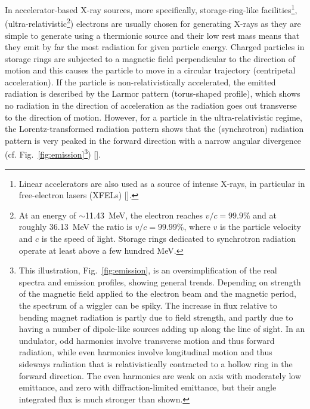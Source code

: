 \begin{refsection}
In accelerator-based X-ray sources, more specifically, storage-ring-like facilities\footnote{Linear accelerators are also used as a source of intense X-rays, in particular in free-electron lasers (XFELs) [\cite{Huang2007}].}, (ultra-relativistic\footnote{At an energy of $\sim$11.43~MeV, the electron reaches $v/c = 99.9\%$ and at roughly 36.13~MeV the ratio is $v/c = 99.99\%$, where $v$ is the particle velocity and $c$ is the speed of light. Storage rings dedicated to synchrotron radiation operate at least above a few hundred MeV.}) electrons are usually chosen for generating X-rays as they are simple to generate using a thermionic source and their low rest mass means that they emit by far the most radiation for given particle energy. Charged particles in storage rings are subjected to a magnetic field perpendicular to the direction of motion and this causes the particle to move in a circular trajectory (centripetal acceleration). If the particle is non-relativistically accelerated, the emitted radiation is described by the Larmor pattern (torus-shaped profile), which shows no radiation in the direction of acceleration as the radiation goes out transverse to the direction of motion. However, for a particle in the ultra-relativistic regime, the Lorentz-transformed radiation pattern shows that the (synchrotron) radiation pattern is very peaked in the forward direction with a narrow angular divergence (cf. Fig.~\ref{fig:emission}\footnote{This illustration, Fig.~\ref{fig:emission}, is an oversimplification of the real spectra and emission profiles, showing general trends. Depending on strength of the magnetic field applied to the electron beam and the magnetic period, the spectrum of a wiggler can be spiky. The increase in flux relative to bending magnet radiation is partly due to field strength, and partly due to having a number of dipole-like sources adding up along the line of sight. In an undulator, odd harmonics involve transverse motion and thus forward radiation, while even harmonics involve longitudinal motion and thus sideways radiation that is relativistically contracted to a hollow ring in the forward direction. The even harmonics are weak on axis with moderately low emittance, and zero with diffraction-limited emittance, but their angle integrated flux is much stronger than shown.}) [\cite{Jackson1998}].


\end{refsection}
